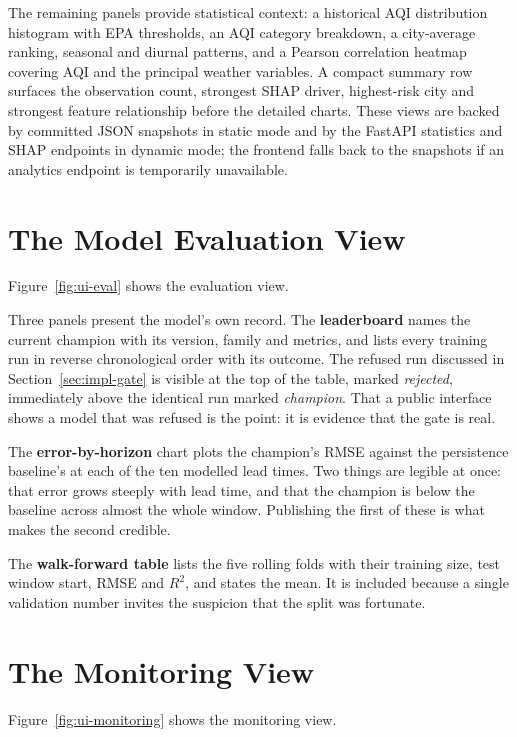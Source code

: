 The remaining panels provide statistical context: a historical AQI distribution
histogram with EPA thresholds, an AQI category breakdown, a city-average ranking,
seasonal and diurnal patterns, and a Pearson correlation heatmap covering AQI and
the principal weather variables. A compact summary row surfaces the observation
count, strongest SHAP driver, highest-risk city and strongest feature relationship
before the detailed charts. These views are backed by committed JSON snapshots in
static mode and by the FastAPI statistics and SHAP endpoints in dynamic mode; the
frontend falls back to the snapshots if an analytics endpoint is temporarily
unavailable.

\section{The Model Evaluation View}
Figure~\ref{fig:ui-eval} shows the evaluation view.


Three panels present the model's own record. The \textbf{leaderboard} names the
current champion with its version, family and metrics, and lists every training
run in reverse chronological order with its outcome. The refused run discussed in
Section~\ref{sec:impl-gate} is visible at the top of the table, marked
\emph{rejected}, immediately above the identical run marked \emph{champion}. That
a public interface shows a model that was refused is the point: it is evidence
that the gate is real.

The \textbf{error-by-horizon} chart plots the champion's RMSE against the
persistence baseline's at each of the ten modelled lead times. Two things are
legible at once: that error grows steeply with lead time, and that the champion is
below the baseline across almost the whole window. Publishing the first of these
is what makes the second credible.

The \textbf{walk-forward table} lists the five rolling folds with their training
size, test window start, RMSE and $R^2$, and states the mean. It is included
because a single validation number invites the suspicion that the split was
fortunate.

\section{The Monitoring View}
Figure~\ref{fig:ui-monitoring} shows the monitoring view.



